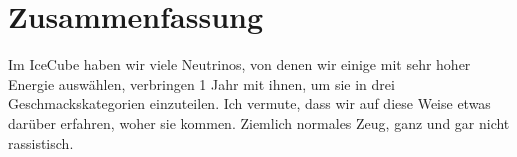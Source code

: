 \chapter{Zusammenfassung}
Im IceCube haben wir viele Neutrinos, von denen wir einige mit sehr hoher Energie auswählen, 
verbringen 1 Jahr mit ihnen, um sie in drei Geschmackskategorien einzuteilen. Ich vermute, dass wir auf diese Weise etwas darüber erfahren, woher sie kommen.
Ziemlich normales Zeug, ganz und gar nicht rassistisch.
